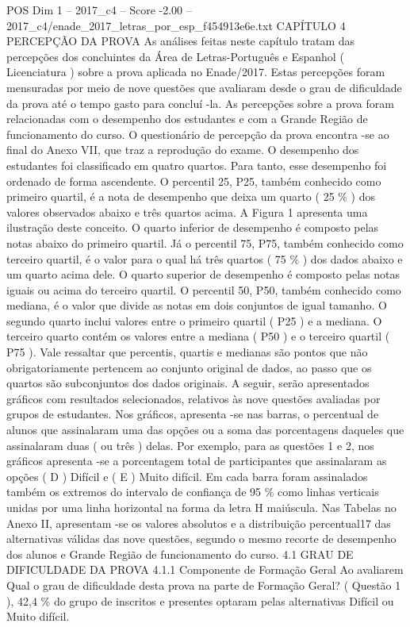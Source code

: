 \begin{textsample}{POS Dim 1 – 2017\_c4 – Score -2.00 – 2017\_c4/enade\_2017\_letras\_por\_esp\_f454913e6e.txt}  \label{ex:f1_pos_273}
CAPÍTULO 4 PERCEPÇÃO DA PROVA As análises feitas neste capítulo tratam das percepções dos concluintes da Área de Letras-Português e Espanhol ( Licenciatura ) sobre a prova aplicada no Enade/2017.
Estas percepções foram mensuradas por meio de nove questões que avaliaram desde o grau de dificuldade da prova até o tempo gasto para concluí -la.
As percepções sobre a prova foram relacionadas com o desempenho dos estudantes e com a Grande Região de funcionamento do curso.
O questionário de percepção da prova encontra -se ao final do Anexo VII, que traz a reprodução do exame.
O desempenho dos estudantes foi classificado em quatro quartos.
Para tanto, esse desempenho foi ordenado de forma ascendente.
O percentil 25, P25, também conhecido como primeiro quartil, é a nota de desempenho que deixa um quarto ( 25 \% ) dos valores observados abaixo e três quartos acima.
A Figura 1 apresenta uma ilustração deste conceito.
O quarto inferior de desempenho é composto pelas notas abaixo do primeiro quartil.
Já o percentil 75, P75, também conhecido como terceiro quartil, é o valor para o qual há três quartos ( 75 \% ) dos dados abaixo e um quarto acima dele.
O quarto superior de desempenho é composto pelas notas iguais ou acima do terceiro quartil.
O percentil 50, P50, também conhecido como mediana, é o valor que divide as notas em dois conjuntos de igual tamanho.
O segundo quarto inclui valores entre o primeiro quartil ( P25 ) e a mediana.
O terceiro quarto contém os valores entre a mediana ( P50 ) e o terceiro quartil ( P75 ).
Vale ressaltar que percentis, quartis e medianas são pontos que não obrigatoriamente pertencem ao conjunto original de dados, ao passo que os quartos são subconjuntos dos dados originais.
A seguir, serão apresentados gráficos com resultados selecionados, relativos às nove questões avaliadas por grupos de estudantes.
Nos gráficos, apresenta -se nas barras, o percentual de alunos que assinalaram uma das opções ou a soma das porcentagens daqueles que assinalaram duas ( ou três ) delas.
Por exemplo, para as questões 1 e 2, nos gráficos apresenta -se a porcentagem total de participantes que assinalaram as opções ( D ) Difícil e ( E ) Muito difícil.
Em cada barra foram assinalados também os extremos do intervalo de confiança de 95 \% como linhas verticais unidas por uma linha horizontal na forma da letra H maiúscula.
Nas Tabelas no Anexo II, apresentam -se os valores absolutos e a distribuição percentual17 das alternativas válidas das nove questões, segundo o mesmo recorte de desempenho dos alunos e Grande Região de funcionamento do curso. 4.1 GRAU DE DIFICULDADE DA PROVA 4.1.1 Componente de Formação Geral Ao avaliarem Qual o grau de dificuldade desta prova na parte de Formação Geral? ( Questão 1 ), 42,4 \% do grupo de inscritos e presentes optaram pelas alternativas Difícil ou Muito difícil.

\end{textsample}
